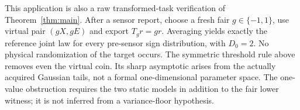 This application is also a raw transformed-task verification of Theorem~\ref{thm:main}. After a sensor report, choose a fresh fair $g\in\{-1,1\}$, use virtual pair $(gX,gE)$ and export $T_gr=gr$. Averaging yields exactly the reference joint law for every pre-sensor sign distribution, with $D_0=2$. No physical randomization of the target occurs. The symmetric threshold rule above removes even the virtual coin. Its sharp asymptotic arises from the actually acquired Gaussian tails, not a formal one-dimensional parameter space. The one-value obstruction requires the two static models in addition to the fair lower witness; it is not inferred from a variance-floor hypothesis.
